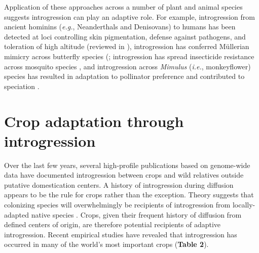 \documentclass[11pt]{article}
\newcommand{\lwang}[1]{\textcolor{red}{ \emph{\scriptsize  #1}} } %
\begin{document}
Application of these approaches across a number of plant and animal species suggests introgression can play an adaptive role. For example, introgression from ancient hominins (\emph{e.g.}, Neanderthals and Denisovans) to humans has been detected at loci controlling skin pigmentation, defense against pathogens, and toleration of high altitude (reviewed in \cite{Racimo2015}), introgression has conferred M\"{u}llerian mimicry across butterfly species (\cite{Heliconius2012}; introgression has spread insecticide resistance across mosquito species \cite{Norris2015}, and introgression across \emph{Mimulus} (\emph{i.e.}, monkeyflower) species has resulted in adaptation to pollinator preference and contributed to speciation \cite{Stankowski2015}.










\section*{Crop adaptation through introgression}


Over the last few years, several high-profile publications based on genome-wide data have documented introgression between crops and wild relatives outside putative domestication centers.
A history of introgression during diffusion appears to be the rule for crops rather than the exception.
Theory suggests that colonizing species will overwhelmingly be recipients of introgression from locally-adapted native species \cite{Currat2008}. Crops, given their frequent history of diffusion from defined centers of origin, are therefore potential recipients of adaptive introgression.
Recent empirical studies have revealed that introgression has occurred in many of the world's most important crops (\textbf{Table 2}).
\end{document}
